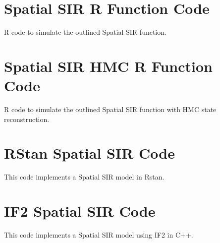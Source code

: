 
\section{Spatial SIR R Function Code}

	R code to simulate the outlined Spatial SIR function.

	

\section{Spatial SIR HMC R Function Code}

	R code to simulate the outlined Spatial SIR function with HMC state reconstruction.

	

\section{RStan Spatial SIR Code}

    This code implements a Spatial SIR model in Rstan.

    

\section{IF2 Spatial SIR Code}

    This code implements a Spatial SIR model using IF2 in C++.

    